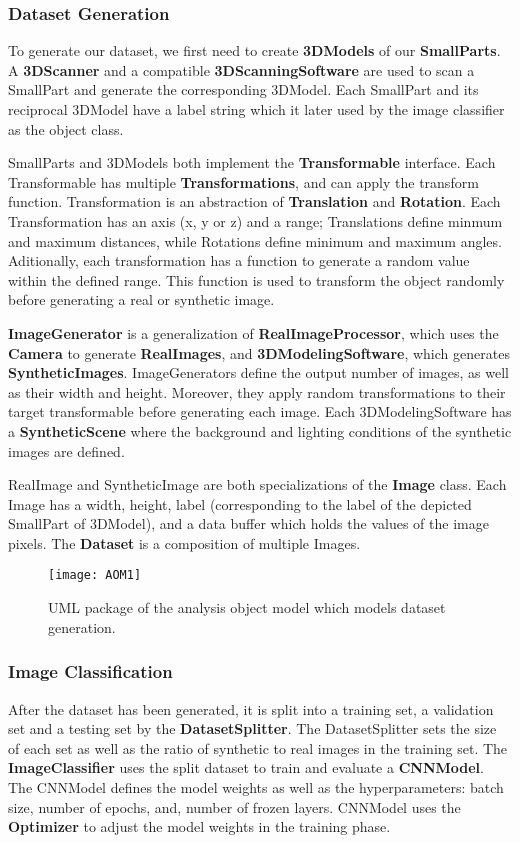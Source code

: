 \subsubsection{Dataset Generation}
To generate our dataset, we first need to create \textbf{3DModels} of our \textbf{SmallParts}. A \textbf{3DScanner} and a compatible \textbf{3DScanningSoftware} are used to scan a SmallPart and generate the corresponding 3DModel. Each SmallPart and its reciprocal 3DModel have a label string which it later used by the image classifier as the object class.

SmallParts and 3DModels both implement the \textbf{Transformable} interface. Each Transformable has multiple \textbf{Transformations}, and can apply the transform function. Transformation is an abstraction of \textbf{Translation} and \textbf{Rotation}. Each Transformation has an axis (x, y or z) and a range; Translations define minmum and maximum distances, while Rotations define minimum and maximum angles. Aditionally, each transformation has a function to generate a random value within the defined range. This function is used to transform the object randomly before generating a real or synthetic image.

\textbf{ImageGenerator} is a generalization of \textbf{RealImageProcessor}, which uses the \textbf{Camera} to generate \textbf{RealImages}, and \textbf{3DModelingSoftware}, which generates \textbf{SyntheticImages}. ImageGenerators define the output number of images, as well as their width and height. Moreover, they apply random transformations to their target transformable before generating each image. Each 3DModelingSoftware has a \textbf{SyntheticScene} where the background and lighting conditions of the synthetic images are defined.

RealImage and SyntheticImage are both specializations of the \textbf{Image} class. Each Image has a width, height, label (corresponding to the label of the depicted SmallPart of 3DModel), and a data buffer which holds the values of the image pixels. The \textbf{Dataset} is a composition of multiple Images.

\begin{figure}[H]
\centering
  \texttt{[image: AOM1]}
\caption{UML package of the analysis object model which models dataset generation.}
\label{fig:AOM1}
\end{figure}

\subsubsection{Image Classification}
After the dataset has been generated, it is split into a training set, a validation set and a testing set by the \textbf{DatasetSplitter}. The DatasetSplitter sets the size of each set as well as the ratio of synthetic to real images in the training set. The \textbf{ImageClassifier} uses the split dataset to train and evaluate a \textbf{CNNModel}. The CNNModel defines the model weights as well as the hyperparameters: batch size, number of epochs, and, number of frozen layers. CNNModel uses the \textbf{Optimizer} to adjust the model weights in the training phase.

